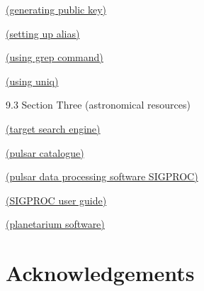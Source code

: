 \documentclass[11pt,fleqn]{book} %
\begin{document}
\href{https://git-scm.com/book/en/v2/Git-on-the-Server-Generating-Your-SSH-Public-Key}{(generating public key)}


\href{https://linuxize.com/post/how-to-create-bash-aliases/}{(setting up alias)}


\href{https://www.web24.com.au/tutorials/use-grep-command-linux}{(using grep command)}


\href{https://www.geeksforgeeks.org/uniq-command-in-linux-with-examples/}{(using uniq)}


\vspace{3mm}

9.3 Section Three (astronomical resources)

\vspace{3mm}
\href{http://simbad.u-strasbg.fr/simbad}{(target search engine)}



\href{https://www.atnf.csiro.au/research/pulsar/psrcat/}{(pulsar catalogue)}


\href{http://sigproc.sourceforge.net/}{(pulsar data processing software SIGPROC)}


\href{http://sigproc.sourceforge.net/sigproc.pdf}{(SIGPROC user guide)}


\href{https://stellarium-web.org/}{(planetarium software)}

\section{Acknowledgements}
%
\end{document}
